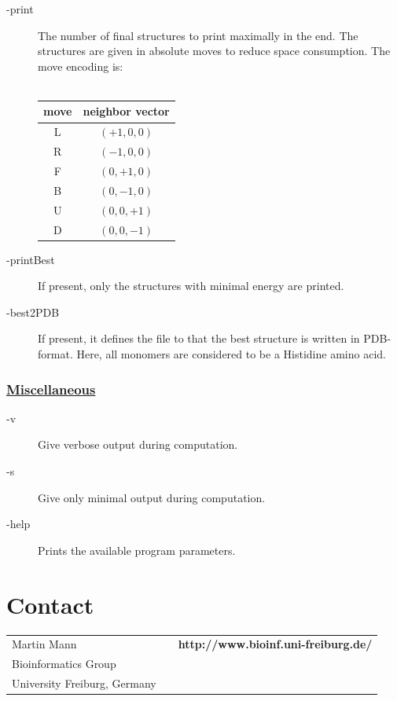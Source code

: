 \documentclass{article}
\begin{document}
\begin{description}
	\item[-print] The number of final structures to print maximally in the end. The
	structures are given in absolute moves to reduce space consumption. The move
	encoding is:\\\\
	\begin{tabular}{c|c}
    	move & neighbor vector \\
    	\hline
    	L & $(+1,0,0)$ \\
    	R & $(-1,0,0)$ \\
    	F & $(0,+1,0)$ \\
    	B & $(0,-1,0)$ \\
    	U & $(0,0,+1)$ \\
    	D & $(0,0,-1)$ 
    \end{tabular}
	\item[-printBest] If present, only the structures with minimal energy are
	printed.
	\item[-best2PDB] If present, it defines the file to that the best structure is
	written in PDB-format. Here, all monomers are considered to be a Histidine
	amino acid.
\end{description}


\subsubsection*{\underline{ Miscellaneous }}

\begin{description}
	\item[-v] Give verbose output during computation.
	\item[-s] Give only minimal output during computation.
	\item[-help] Prints the available program parameters.
\end{description}


\section{Contact}

\begin{tabular}{lcr}
	Martin Mann  && \bfseries http://www.bioinf.uni-freiburg.de/\\
	Bioinformatics Group\\
	University Freiburg, Germany \\
\end{tabular}
\end{document}
